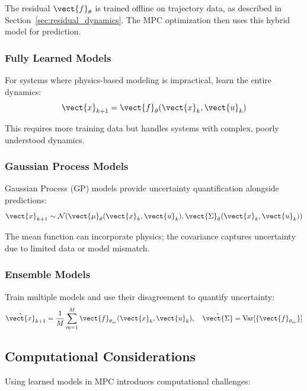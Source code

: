 The residual $\vect{f}_\theta$ is trained offline on trajectory data, as described in Section~\ref{sec:residual_dynamics}. The MPC optimization then uses this hybrid model for prediction.

\subsubsection{Fully Learned Models}

For systems where physics-based modeling is impractical, learn the entire dynamics:
\begin{equation}
\vect{x}_{k+1} = \vect{f}_\theta(\vect{x}_k, \vect{u}_k)
\label{eq:learned_mpc_model}
\end{equation}

This requires more training data but handles systems with complex, poorly understood dynamics.

\subsubsection{Gaussian Process Models}

Gaussian Process (GP) models provide uncertainty quantification alongside predictions:
\begin{equation}
\vect{x}_{k+1} \sim \mathcal{N}(\vect{\mu}_\theta(\vect{x}_k, \vect{u}_k), \vect{\Sigma}_\theta(\vect{x}_k, \vect{u}_k))
\label{eq:gp_model}
\end{equation}

The mean function can incorporate physics; the covariance captures uncertainty due to limited data or model mismatch.

\subsubsection{Ensemble Models}

Train multiple models and use their disagreement to quantify uncertainty:
\begin{equation}
\hat{\vect{x}}_{k+1} = \frac{1}{M}\sum_{m=1}^{M} \vect{f}_{\theta_m}(\vect{x}_k, \vect{u}_k), \quad \hat{\vect{\Sigma}} = \text{Var}[\{\vect{f}_{\theta_m}\}]
\label{eq:ensemble_model}
\end{equation}

\subsection{Computational Considerations}

Using learned models in MPC introduces computational challenges:

